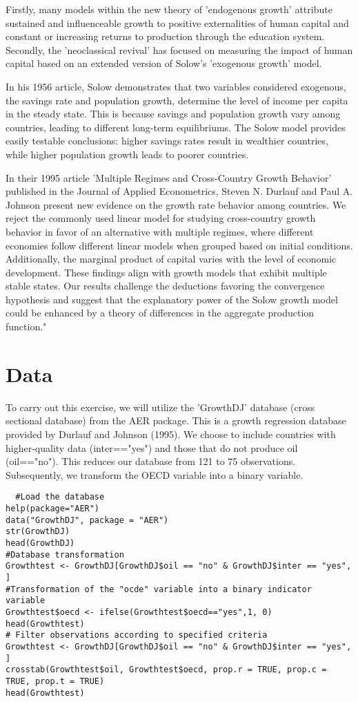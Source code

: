 \documentclass[12pt,fleqn]{report}
\begin{document}
Firstly, many models within the new theory of 'endogenous growth' attribute sustained and influenceable growth to positive externalities of human capital and constant or increasing returns to production through the education system. Secondly, the 'neoclassical revival' has focused on measuring the impact of human capital based on an extended version of Solow's 'exogenous growth' model.

In his 1956 article, Solow demonstrates that two variables considered exogenous, the savings rate and population growth, determine the level of income per capita in the steady state. This is because savings and population growth vary among countries, leading to different long-term equilibriums. The Solow model provides easily testable conclusions: higher savings rates result in wealthier countries, while higher population growth leads to poorer countries.

In their 1995 article 'Multiple Regimes and Cross-Country Growth Behavior' published in the Journal of Applied Econometrics, Steven N. Durlauf and Paul A. Johnson present new evidence on the growth rate behavior among countries. We reject the commonly used linear model for studying cross-country growth behavior in favor of an alternative with multiple regimes, where different economies follow different linear models when grouped based on initial conditions. Additionally, the marginal product of capital varies with the level of economic development. These findings align with growth models that exhibit multiple stable states. Our results challenge the deductions favoring the convergence hypothesis and suggest that the explanatory power of the Solow growth model could be enhanced by a theory of differences in the aggregate production function."

\section*{Data}

To carry out this exercise, we will utilize the 'GrowthDJ' database (cross sectional database) from the AER package. This is a growth regression database provided by Durlauf and Johnson (1995). We choose to include countries with higher-quality data (inter=="yes") and those that do not produce oil (oil=="no"). This reduces our database from 121 to 75 observations. Subsequently, we transform the OECD variable into a binary variable.


\begin{lstlisting}
  #Load the database
help(package="AER")
data("GrowthDJ", package = "AER")
str(GrowthDJ)
head(GrowthDJ)
#Database transformation
Growthtest <- GrowthDJ[GrowthDJ$oil == "no" & GrowthDJ$inter == "yes", ]
#Transformation of the "ocde" variable into a binary indicator variable
Growthtest$oecd <- ifelse(Growthtest$oecd=="yes",1, 0) 
head(Growthtest)
# Filter observations according to specified criteria
Growthtest <- GrowthDJ[GrowthDJ$oil == "no" & GrowthDJ$inter == "yes", ]
crosstab(Growthtest$oil, Growthtest$oecd, prop.r = TRUE, prop.c = TRUE, prop.t = TRUE)
head(Growthtest)

\end{lstlisting}
 
\end{document}
